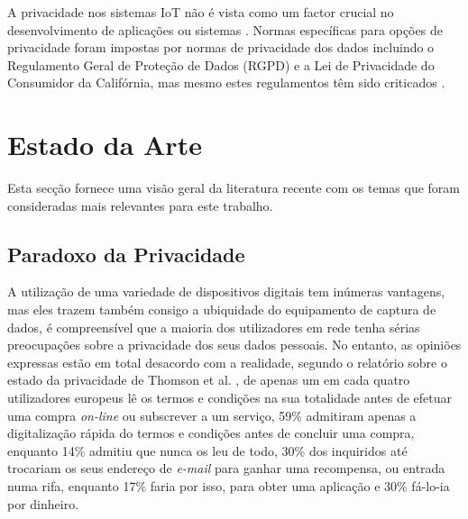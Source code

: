 \documentclass[conference]{IEEEtran}
\begin{document}
A privacidade nos sistemas IoT não é vista como um factor crucial no desenvolvimento
de aplicações ou sistemas \cite{alhirabi2021security}. Normas específicas
para opções de privacidade foram impostas por normas de privacidade dos dados
incluindo o Regulamento Geral de Proteção de Dados (RGPD) e a Lei de Privacidade
do Consumidor da Califórnia, mas mesmo estes regulamentos têm sido criticados \cite{peloquin2020disruptive, gladis2022weaponizing, gentile2022deficient, green2022flaws, byun2019privacy}.


\section{Estado da Arte}

\par
Esta secção fornece uma visão geral da literatura recente com os temas que
foram consideradas mais relevantes para este trabalho.


\subsection{Paradoxo da Privacidade}

A utilização de uma variedade de dispositivos digitais tem inúmeras vantagens,
mas eles trazem também consigo a ubiquidade do equipamento de captura de dados,
é compreensível que a maioria dos utilizadores em rede tenha sérias preocupações
sobre a privacidade dos seus dados pessoais. No entanto, as opiniões expressas
estão em total desacordo com a realidade, segundo o relatório sobre o estado
da privacidade de Thomson et al. \cite{DarrenState}, de apenas um em cada
quatro utilizadores europeus lê os termos e condições na sua totalidade antes
de efetuar uma compra \textit{on-line} ou subscrever a um serviço, 59\% admitiram
apenas a digitalização rápida do termos e condições antes de concluir uma
compra, enquanto 14\% admitiu que nunca os leu de todo, 30\% dos inquiridos
até trocariam os seus endereço de \textit{e-mail} para ganhar uma recompensa,
ou entrada numa rifa, enquanto 17\% faria por isso, para obter uma aplicação
e 30\% fá-lo-ia por dinheiro.
\end{document}
